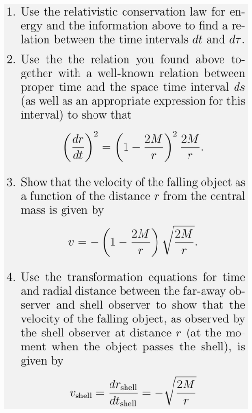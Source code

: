 \documentclass{beamer}
\begin{document}
{
\centerline{\includegraphics[scale=0.32]{media/2c4.png}}
}
\end{document}
